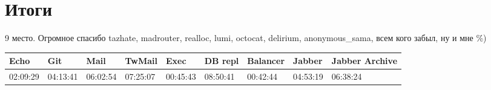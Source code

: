 \documentclass[a4paper,10pt]{report}
\begin{document}
\part{Итоги}
9 место. Огромное спасибо tazhate, madrouter, realloc, lumi, octocat, delirium, anonymous\_sama, всем кого забыл, ну и мне \%)
\newline\newline
\begin{tabular}{ | l | l | l | l | l | l | l | l | l | }
  \hline
  Echo & Git & Mail & TwMail & Exec & DB repl & Balancer & Jabber & Jabber Archive\\ \hline
  02:09:29 & 04:13:41 & 06:02:54 & 07:25:07 & 00:45:43 & 08:50:41 & 00:42:44 & 04:53:19 & 06:38:24\\
  \hline
\end{tabular}
\end{document}
